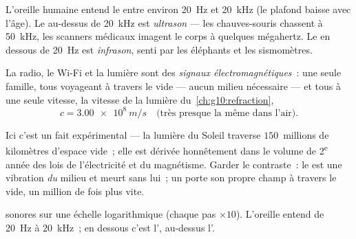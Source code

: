 \begin{definition}\label{def:g10:signals-and-waves:ultrasound}
L'oreille humaine entend le  entre environ \qty{20}{Hz} et
\qty{20}{kHz} (le plafond baisse avec l'âge). Le
 au-dessus de \qty{20}{kHz} est
\emph{ultrason} --- les chauves-souris chassent à
\qty{50}{kHz}, les scanners médicaux imagent le corps à quelques
mégahertz. Le  en dessous de \qty{20}{Hz} est
\emph{infrason}, senti par les éléphants et les
sismomètres.
\end{definition}

\begin{proposition}\label{prop:g10:signals-and-waves:em}
La radio, le Wi-Fi et la lumière sont des \emph{signaux
électromagnétiques}~: une seule famille,
tous voyageant à travers le vide --- aucun milieu nécessaire --- et tous
à une seule vitesse, la vitesse de la lumière
du~\cref{ch:g10:refraction},
\[
c = \qty{3.00e8}{m/s} \quad \text{(très presque la même dans l'air).}
\]
\end{proposition}
\admitted

\begin{remark}\label{rem:g10:signals-and-waves:honest}
Ici c'est un fait expérimental --- la lumière du Soleil traverse
$150$~millions de kilomètres d'espace vide~; elle est dérivée
honnêtement dans le volume de 2\textsuperscript{e} année des lois de
l'électricité et du magnétisme. Garder le contraste~: le
 est une vibration \emph{du} milieu et meurt sans lui~; un
 porte son propre champ à travers le
vide, un million de fois plus vite.
\end{remark}

\begin{omfigure}

{\small {} sonores sur une échelle logarithmique
(chaque pas $\times 10$). L'oreille entend de \qty{20}{Hz} à
\qty{20}{kHz}~; en dessous c'est l', au-dessus
l'.}
\end{omfigure}

